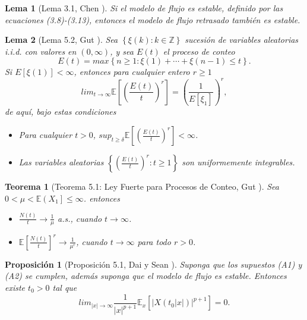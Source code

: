 \documentclass{article}
\newtheorem{Teo}{Teorema}
\newtheorem{Prop}{Proposición}
\newtheorem{Lema}{Lema}
\newcommand{\ent}{\mathbb{Z}}
\newcommand{\esp}{\mathbb{E}}
\begin{document}
\begin{Lema}[Lema 3.1, Chen \cite{Chen}]\label{Lema3.1}
Si el modelo de flujo es estable, definido por las ecuaciones
(3.8)-(3.13), entonces el modelo de flujo retrasado tambi\'en es
estable.
\end{Lema}

\begin{Lema}[Lema 5.2, Gut \cite{Gut}]\label{Lema.5.2.Gut}
Sea $\left\{\xi\left(k\right):k\in\ent\right\}$ sucesi\'on de
variables aleatorias i.i.d. con valores en
$\left(0,\infty\right)$, y sea $E\left(t\right)$ el proceso de
conteo
\[E\left(t\right)=max\left\{n\geq1:\xi\left(1\right)+\cdots+\xi\left(n-1\right)\leq t\right\}.\]
Si $E\left[\xi\left(1\right)\right]<\infty$, entonces para
cualquier entero $r\geq1$
\begin{equation}
lim_{t\rightarrow\infty}\esp\left[\left(\frac{E\left(t\right)}{t}\right)^{r}\right]=\left(\frac{1}{E\left[\xi_{1}\right]}\right)^{r},
\end{equation}
de aqu\'i, bajo estas condiciones
\begin{itemize}
\item[a)] Para cualquier $t>0$,
$sup_{t\geq\delta}\esp\left[\left(\frac{E\left(t\right)}{t}\right)^{r}\right]<\infty$.

\item[b)] Las variables aleatorias
$\left\{\left(\frac{E\left(t\right)}{t}\right)^{r}:t\geq1\right\}$
son uniformemente integrables.
\end{itemize}
\end{Lema}

\begin{Teo}[Teorema 5.1: Ley Fuerte para Procesos de Conteo, Gut
\cite{Gut}]\label{Tma.5.1.Gut} Sea
$0<\mu<\esp\left(X_{1}\right]\leq\infty$. entonces

\begin{itemize}
\item[a)] $\frac{N\left(t\right)}{t}\rightarrow\frac{1}{\mu}$
a.s., cuando $t\rightarrow\infty$.


\item[b)]$\esp\left[\frac{N\left(t\right)}{t}\right]^{r}\rightarrow\frac{1}{\mu^{r}}$,
cuando $t\rightarrow\infty$ para todo $r>0$.
\end{itemize}
\end{Teo}


\begin{Prop}[Proposici\'on 5.1, Dai y Sean \cite{DaiSean}]\label{Prop.5.1}
Suponga que los supuestos (A1) y (A2) se cumplen, adem\'as suponga
que el modelo de flujo es estable. Entonces existe $t_{0}>0$ tal
que
\begin{equation}\label{Eq.Prop.5.1}
lim_{|x|\rightarrow\infty}\frac{1}{|x|^{p+1}}\esp_{x}\left[|X\left(t_{0}|x|\right)|^{p+1}\right]=0.
\end{equation}

\end{Prop}
\end{document}
